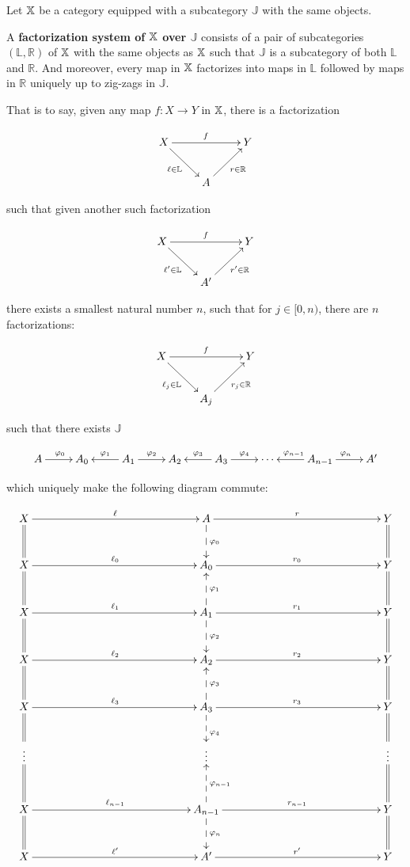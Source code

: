 \begin{definition}
Let $\mathbb{X}$ be a category equipped with a subcategory $\mathbb J$ with the same objects.

A {\bf factorization system of $\mathbb{X}$ over $\mathbb J$} consists of a pair of subcategories $(\mathbb L,\mathbb R)$ of $\mathbb{X}$ with the same objects as $\mathbb{X}$ such that $\mathbb J$ is a subcategory of both $\mathbb L$ and $\mathbb R$.  And moreover, every map in $\mathbb{X}$ factorizes into maps in $\mathbb L$ followed by maps in $\mathbb R$ uniquely up to zig-zags in $\mathbb J$.

That is to say, given any map $f:X\to Y$ in $\mathbb{X}$, there is a factorization

$$
\xymatrix{
X  \ar[rr]^{f} \ar[dr]_{\ell \in {\mathbb L}} &       & Y\\
   & A \ar[ur]_{r \in {\mathbb R}}
}
$$

such that given another such factorization

$$
\xymatrix{
X  \ar[rr]^{f} \ar[dr]_{\ell' \in {\mathbb L}} &       & Y\\
   & A' \ar[ur]_{r'  \in {\mathbb R}}
}
$$

there exists a smallest natural number $n$, such that  for $j \in [0,n)$, there are $n$ factorizations:


$$
\xymatrix{
X  \ar[rr]^{f} \ar[dr]_{\ell_j\in {\mathbb L}} &       & Y\\
   & A_j \ar[ur]_{r_j \in {\mathbb R}}
}
$$

such that there exists $\mathbb J$

$$
\xymatrix{
A \ar[r]^{\phi_0}
& A_0 
& A_1 \ar[l]_{\phi_1} \ar[r]^{\phi_2}
& A_2 
& A_3 \ar[l]_{\phi_3} \ar[r]^{\phi_4}
&\cdots
& A_{n-1} \ar[l]_{\phi_{n-1}} \ar[r]^{\phi_n}
& A'
}
$$

which uniquely make the following diagram commute:


$$
\xymatrixrowsep{10mm}
\xymatrixcolsep{50mm}
\xymatrix{
X   \ar[r]^{\ell}\ar@{=}[d]              & A \ar@{-->}[d]^{\phi_0} \ar[r]^{r}                                               & Y \ar@{=}[d]\\
X   \ar[r]^{\ell_0}\ar@{=}[d]          & A_0  \ar[r]^{r_0}                                                                          & Y\ar@{=}[d]\\
X   \ar[r]^{\ell_1}\ar@{=}[d]           & A_1 \ar@{-->}[u]_{\phi_1} \ar@{-->}[d]^{\phi_2} \ar[r]^{r_1}  & Y \ar@{=}[d]\\
X   \ar[r]^{\ell_2}\ar@{=}[d]           & A_2 \ar[r]^{r_2}                                                                             & Y \ar@{=}[d]\\
X   \ar[r]^{\ell_3}\ar@{=}[d]         & A_ 3\ar@{-->}[u]_{\phi_3} \ar@{-->}[d]^{\phi_4}\ar[r]^{r_3}   & Y \ar@{=}[d]\\
 \vdots\ar@{=}[d]         & \vdots & \vdots \ar@{=}[d] \\
X   \ar[r]^{\ell_{n-1}}\ar@{=}[d]   & A_{n-1}  \ar@{-->}[u]_{\phi_{n-1}} \ar@{-->}[d]^{\phi_n}  \ar[r]^{r_{n-1}}         & Y    \ar@{=}[d]\\
X   \ar[r]^{\ell'}                         & A'   \ar[r]^{r'} & Y
}
$$

\end{definition}

